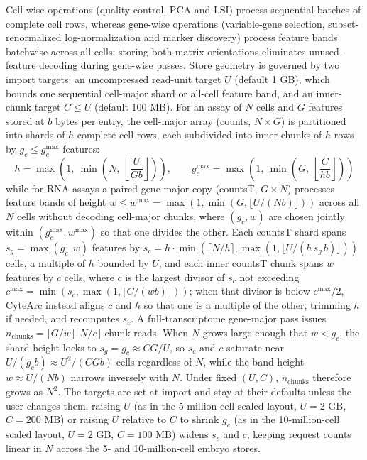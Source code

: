 \documentclass[11pt]{article}
\begin{document}
Cell-wise operations (quality control, PCA and LSI) process sequential batches of complete cell rows, whereas gene-wise operations (variable-gene selection, subset-renormalized log-normalization and marker discovery) process feature bands batchwise across all cells; storing both matrix orientations eliminates unused-feature decoding during gene-wise passes. Store geometry is governed by two import targets: an uncompressed read-unit target $U$ (default 1 GB), which bounds one sequential cell-major shard or all-cell feature band, and an inner-chunk target $C\le U$ (default 100 MB). For an assay of $N$ cells and $G$ features stored at $b$ bytes per entry, the cell-major array (counts, $N\times G$) is partitioned into shards of $h$ complete cell rows, each subdivided into inner chunks of $h$ rows by $g_c\le g_c^{\max}$ features:
\[
h=\max\left(1,\ \min\left(N,\ \left\lfloor\frac{U}{Gb}\right\rfloor\right)\right),\qquad g_c^{\max}=\max\left(1,\ \min\left(G,\ \left\lfloor\frac{C}{hb}\right\rfloor\right)\right)
\]
while for RNA assays a paired gene-major copy (countsT, $G\times N$) processes feature bands of height $w\le w^{\max}=\max(1,\min(G,\lfloor U/(Nb)\rfloor))$ across all $N$ cells without decoding cell-major chunks, where $(g_c,w)$ are chosen jointly within $(g_c^{\max},w^{\max})$ so that one divides the other. Each countsT shard spans $s_g=\max(g_c,w)$ features by $s_c=h\cdot\min(\lceil N/h\rceil,\max(1,\lfloor U/(h\,s_g\,b)\rfloor))$ cells, a multiple of $h$ bounded by $U$, and each inner countsT chunk spans $w$ features by $c$ cells, where $c$ is the largest divisor of $s_c$ not exceeding $c^{\max}=\min(s_c,\max(1,\lfloor C/(wb)\rfloor))$; when that divisor is below $c^{\max}/2$, CyteArc instead aligns $c$ and $h$ so that one is a multiple of the other, trimming $h$ if needed, and recomputes $s_c$. A full-transcriptome gene-major pass issues $n_{\mathrm{chunks}}=\lceil G/w\rceil\lceil N/c\rceil$ chunk reads. When $N$ grows large enough that $w<g_c$, the shard height locks to $s_g=g_c\approx CG/U$, so $s_c$ and $c$ saturate near $U/(g_cb)\approx U^{2}/(CGb)$ cells regardless of $N$, while the band height $w\approx U/(Nb)$ narrows inversely with $N$. Under fixed $(U,C)$, $n_{\mathrm{chunks}}$ therefore grows as $N^{2}$. The targets are set at import and stay at their defaults unless the user changes them; raising $U$ (as in the 5-million-cell scaled layout, $U=2$ GB, $C=200$ MB) or raising $U$ relative to $C$ to shrink $g_c$ (as in the 10-million-cell scaled layout, $U=2$ GB, $C=100$ MB) widens $s_c$ and $c$, keeping request counts linear in $N$ across the 5- and 10-million-cell embryo stores.
\end{document}
